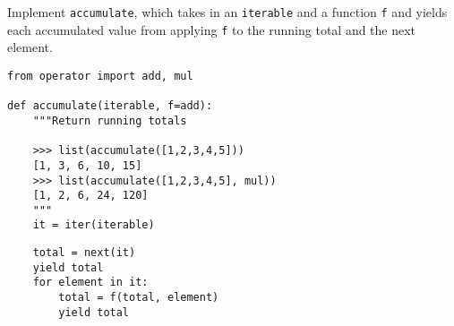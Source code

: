 \begin{blocksection}
\question Implement \lstinline$accumulate$, which takes in an
\lstinline$iterable$ and a function \lstinline$f$ and yields each accumulated
value from applying \lstinline$f$ to the running total and the next element.

\begin{lstlisting}
from operator import add, mul

def accumulate(iterable, f=add):
    """Return running totals

    >>> list(accumulate([1,2,3,4,5]))
    [1, 3, 6, 10, 15]
    >>> list(accumulate([1,2,3,4,5], mul))
    [1, 2, 6, 24, 120]
    """
    it = iter(iterable)
\end{lstlisting}

\begin{solution}[1.5in]
\begin{lstlisting}
    total = next(it)
    yield total
    for element in it:
        total = f(total, element)
        yield total
\end{lstlisting}
\end{solution}
\end{blocksection}
